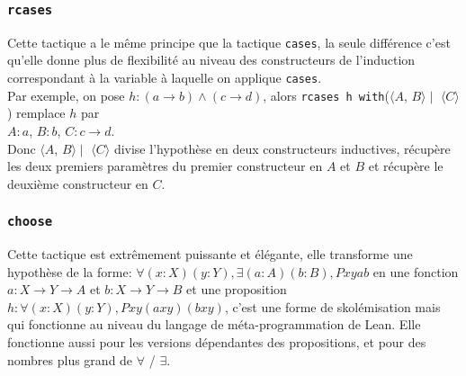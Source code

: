     \subsubsection{ \texttt{rcases}}
     Cette tactique a le même principe que la tactique \texttt{cases}, la seule différence c'est qu'elle donne plus de flexibilité au niveau des constructeurs de l'induction correspondant à la variable à laquelle on applique \texttt{cases}. \\ Par exemple, on pose $h:(a\rightarrow b)\wedge(c\rightarrow d)$, alors \texttt{rcases h with}($\langle A$, $B \rangle \mid $ $\langle C \rangle$) remplace $h$ par \\ $A:a$, $B:b$, $C:c\rightarrow d$.\\ Donc $\langle A$, $B \rangle \mid$ $\langle C\rangle$ divise l'hypothèse en deux constructeurs inductives, récupère les deux premiers paramètres du premier constructeur en $A$ et $B$ et récupère le deuxième constructeur en $C$. 
     \subsubsection{\texttt{choose}}
     Cette tactique est extrêmement puissante et élégante, elle transforme une hypothèse de la forme: $\forall (x: X) (y: Y), \exists (a: A) (b: B), P x y a b$ en une fonction $a : X \to Y \to A$ et $b : X \to Y \to B$ et une proposition $h: \forall (x: X) (y: Y), P x y (a x y) (b x y)$, c'est une forme de skolémisation mais qui fonctionne au niveau du langage de méta-programmation de Lean.
     Elle fonctionne aussi pour les versions dépendantes des propositions, et pour des nombres plus grand de $\forall$ / $\exists$.
